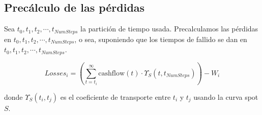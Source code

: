 
\subsection{Prec\'alculo de las p\'erdidas}

Sea $t_0, t_1, t_2, \cdots, t_{NumSteps}$ la partici\'on de tiempo usada.
Precalculamos las p\'erdidas en $t_0, t_1, t_2, \cdots, t_{NumSteps}$, o sea,
suponiendo que los tiempos de fallido se dan en $t_0, t_1, t_2, \cdots, t_{NumSteps}$.

\begin{displaymath}
Losses_i =
\left(
  \sum_{t=t_i}^{\infty} \textrm{cashflow}(t) \cdot \Upsilon_S(t,t_{NumSteps}) 
\right) - W_i
\end{displaymath}

donde $\Upsilon_S(t_i,t_j)$ es el coeficiente de transporte entre $t_i$ y $t_j$
usando la curva spot $S$.

